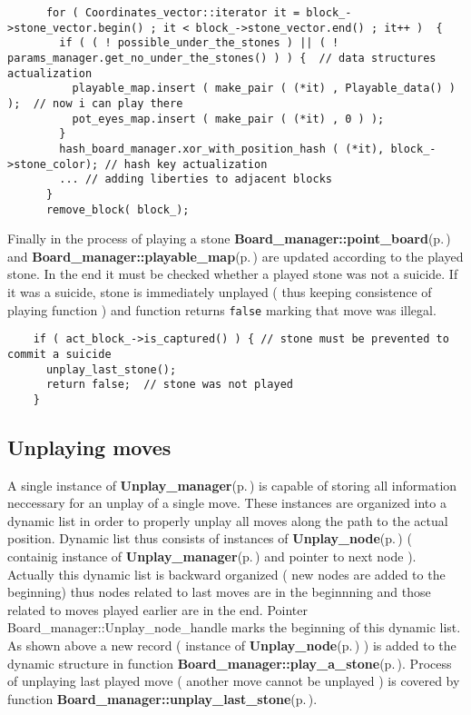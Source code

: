 \footnotesize\begin{verbatim}      for ( Coordinates_vector::iterator it = block_->stone_vector.begin() ; it < block_->stone_vector.end() ; it++ )  {
        if ( ( ! possible_under_the_stones ) || ( ! params_manager.get_no_under_the_stones() ) ) {  // data structures actualization
          playable_map.insert ( make_pair ( (*it) , Playable_data() ) );  // now i can play there 
          pot_eyes_map.insert ( make_pair ( (*it) , 0 ) );  
        }
        hash_board_manager.xor_with_position_hash ( (*it), block_->stone_color); // hash key actualization
        ... // adding liberties to adjacent blocks 
      }
      remove_block( block_);
\end{verbatim}
\normalsize


Finally in the process of playing a stone {\bf Board\_\-manager::point\_\-board}{\rm (p.\,\pageref{classBoard__manager_o5})} and {\bf Board\_\-manager::playable\_\-map}{\rm (p.\,\pageref{classBoard__manager_r2})} are updated according to the played stone. In the end it must be checked whether a played stone was not a suicide. If it was a suicide, stone is immediately unplayed ( thus keeping consistence of playing function ) and function returns {\tt false} marking that move was illegal.



\footnotesize\begin{verbatim}    if ( act_block_->is_captured() ) { // stone must be prevented to commit a suicide
      unplay_last_stone();
      return false;  // stone was not played 
    }
\end{verbatim}
\normalsize
\subsection{Unplaying moves}\label{page_6_page_6__sec_4}
A single instance of {\bf Unplay\_\-manager}{\rm (p.\,\pageref{structUnplay__manager})} is capable of storing all information neccessary for an unplay of a single move. These instances are organized into a dynamic list in order to properly unplay all moves along the path to the actual position. Dynamic list thus consists of instances of {\bf Unplay\_\-node}{\rm (p.\,\pageref{structUnplay__node})} ( containig instance of {\bf Unplay\_\-manager}{\rm (p.\,\pageref{structUnplay__manager})} and pointer to next node ). Actually this dynamic list is backward organized ( new nodes are added to the beginning) thus nodes related to last moves are in the beginnning and those related to moves played earlier are in the end. Pointer Board\_\-manager::Unplay\_\-node\_\-handle marks the beginning of this dynamic list. As shown above a new record ( instance of {\bf Unplay\_\-node}{\rm (p.\,\pageref{structUnplay__node})} ) is added to the dynamic structure in function {\bf Board\_\-manager::play\_\-a\_\-stone}{\rm (p.\,\pageref{classBoard__manager_a4})}. Process of unplaying last played move ( another move cannot be unplayed ) is covered by function {\bf Board\_\-manager::unplay\_\-last\_\-stone}{\rm (p.\,\pageref{classBoard__manager_a16})}.

